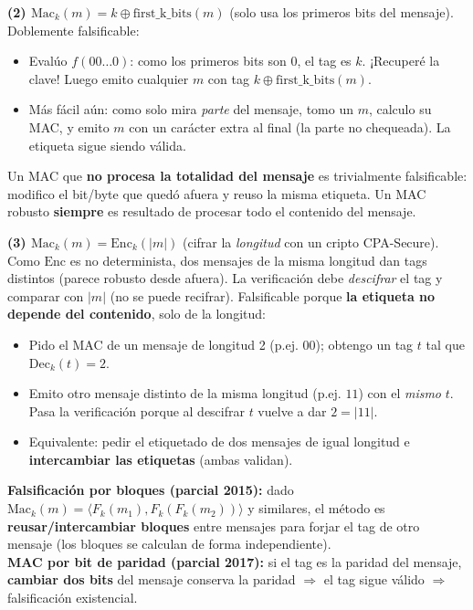 \documentclass[../main.tex]{subfiles}
\begin{document}
\textbf{(2) $\mathrm{Mac}_k(m) = k \oplus \mathrm{first\_k\_bits}(m)$} (solo usa los
primeros bits del mensaje). Doblemente falsificable:
\begin{itemize}[leftmargin=1.4em,nosep]
  \item Evalúo $f(00\ldots0)$: como los primeros bits son 0, el tag es $k$. ¡Recuperé la clave!
  Luego emito cualquier $m$ con tag $k \oplus \mathrm{first\_k\_bits}(m)$.
  \item Más fácil aún: como solo mira \emph{parte} del mensaje, tomo un $m$, calculo su
  MAC, y emito $m$ con un carácter extra al final (la parte no chequeada). La etiqueta
  sigue siendo válida.
\end{itemize}
\begin{destacado}
Un MAC que \textbf{no procesa la totalidad del mensaje} es trivialmente falsificable:
modifico el bit/byte que quedó afuera y reuso la misma etiqueta. Un MAC robusto
\textbf{siempre} es resultado de procesar todo el contenido del mensaje.
\end{destacado}

\textbf{(3) $\mathrm{Mac}_k(m) = \mathrm{Enc}_k(|m|)$} (cifrar la \emph{longitud} con un
cripto CPA-Secure). Como $\mathrm{Enc}$ es no determinista, dos mensajes de la misma
longitud dan tags distintos (parece robusto desde afuera). La verificación debe
\emph{descifrar} el tag y comparar con $|m|$ (no se puede recifrar). Falsificable
porque \textbf{la etiqueta no depende del contenido}, solo de la longitud:
\begin{itemize}[leftmargin=1.4em,nosep]
  \item Pido el MAC de un mensaje de longitud 2 (p.ej. $00$); obtengo un tag $t$ tal que
  $\mathrm{Dec}_k(t)=2$.
  \item Emito otro mensaje distinto de la misma longitud (p.ej. $11$) con el \emph{mismo} $t$.
  Pasa la verificación porque al descifrar $t$ vuelve a dar $2 = |11|$.
  \item Equivalente: pedir el etiquetado de dos mensajes de igual longitud e
  \textbf{intercambiar las etiquetas} (ambas validan).
\end{itemize}

\begin{examen}
\textbf{Falsificación por bloques (parcial 2015):} dado
$\mathrm{Mac}_k(m)=\langle F_k(m_1), F_k(F_k(m_2))\rangle$ y similares, el método es
\textbf{reusar/intercambiar bloques} entre mensajes para forjar el tag de otro
mensaje (los bloques se calculan de forma independiente).\\[2pt]
\textbf{MAC por bit de paridad (parcial 2017):} si el tag es la paridad del mensaje,
\textbf{cambiar dos bits} del mensaje conserva la paridad $\Rightarrow$ el tag sigue
válido $\Rightarrow$ falsificación existencial.
\end{examen}
\end{document}
